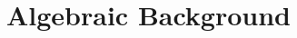 






\maketitle


\begin{Preface}

%
%
%
%
%
%


%
%


\tableofcontents

\end{Preface}


\pagestyle{fancyplain}




%
%

\chapter{Algebraic Background} 
\label{chap:algbackground} 
\doublespacing


